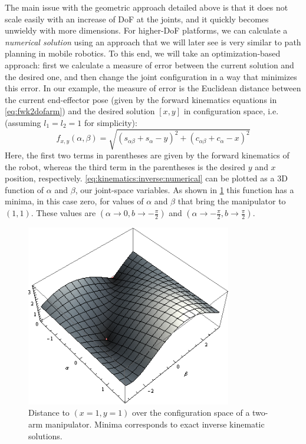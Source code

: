 The main issue with the geometric approach detailed above is that it does not scale easily with an increase of DoF at the joints, and it quickly becomes unwieldy with more dimensions.
For higher-DoF platforms, we can calculate a \textsl{numerical solution} using an approach that we will later see is very similar to path planning in mobile robotics.
To this end, we will take an optimization-based approach: first we calculate a measure of error between the current solution and the desired one, and then change the joint configuration in a way that minimizes this error.
In our example, the measure of error is the Euclidean distance between the current end-effector pose (given by the forward kinematics equations in \cref{eq:fwk2dofarm}) and the desired solution $[x,y]$ in configuration space, i.e. (assuming $l_1=l_2=1$ for simplicity):
\begin{equation}\label{eq:kinematics:inverse:numerical}
f_{x,y}(\alpha,\beta)=\sqrt{\left(s_{\alpha\beta} + s_\alpha - y\right)^2 + \left(c_{\alpha\beta}+c_\alpha - x\right)^2}
\end{equation}
Here, the first two terms in parentheses are given by the forward kinematics of the robot, whereas the third term in the parentheses is the desired $y$ and $x$ position, respectively.
\cref{eq:kinematics:inverse:numerical} can be plotted as a 3D function of $\alpha$ and $\beta$, our joint-space variables.
As shown in \cref{fig:inversekinematics} this function has a minima, in this case zero, for values of $\alpha$ and $\beta$ that bring the manipulator to $(1,1)$. These values are $(\alpha \rightarrow 0, b \rightarrow -\frac{\pi}{2})$ and $(\alpha \rightarrow -\frac{\pi}{2}, b \rightarrow \frac{\pi}{2})$.

\begin{figure}
    \centering
        \includegraphics[width=0.8\textwidth]{figs/kinematics/inversekinematics}
    \caption{Distance to $(x=1,y=1)$ over the configuration space of a two-arm manipulator. Minima corresponds to exact inverse kinematic solutions.}
    \label{fig:inversekinematics}
\end{figure}

